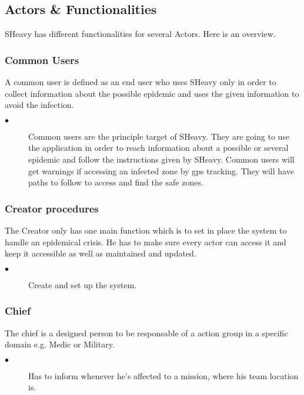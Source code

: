 \subsection{Actors \& Functionalities}
SHeavy has different functionalities for several Actors. Here is an overview.\\

\subsubsection{Common Users}
A common user is defined as an end user who uses SHeavy only in order to
collect information about the possible epidemic and uses the given information
to avoid the infection.\\
\begin{description}
 \item[$\bullet$] Common users are the principle target of SHeavy. They are
 going to use the application in order to reach information about a possible
 or several epidemic and follow the instructions given by SHeavy. Common users will get warnings if accessing an infected
zone by gps tracking. They will have paths to follow to access and find the
safe zones.
\end{description}

\subsubsection{Creator procedures}

The Creator only has one main function which is to set in place the system to
handle an epidemical crisis. He has to make sure every actor can access it and
keep it accessible as well as maintained and updated.\\
\begin{description}
 \item[$\bullet$] Create and set up the system.
\end{description} 

\subsubsection{Chief}
The chief is a designed person to be responsable of a action group in a specific
domain e.g. Medic or Military.\\
\begin{description}
 \item[$\bullet$] Has to inform whenever he's affected to a mission, where his
 team location is.
\end{description} 

